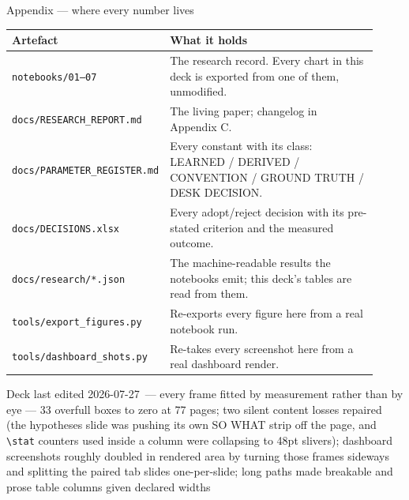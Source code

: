 \documentclass[aspectratio=169,11pt]{beamer}
\newcommand{\lastedited}{2026-07-27}
\newcommand{\lastcommit}{%
  every frame fitted by measurement rather than by eye --- 33 overfull boxes to
  zero at 77 pages; two silent content losses repaired (the hypotheses slide was
  pushing its own SO WHAT strip off the page, and \texttt{\textbackslash stat}
  counters used inside a column were collapsing to 48pt slivers); dashboard
  screenshots roughly doubled in rendered area by turning those frames sideways
  and splitting the paired tab slides one-per-slide; long paths made breakable
  and prose table columns given declared widths}
\newcommand{\pb}{\discretionary{}{}{}}
\begin{document}
\appendix
\begin{frame}{Appendix --- where every number lives}
  \footnotesize
  \begin{table}
    \renewcommand{\arraystretch}{0.92}
    \begin{tabular}{@{}p{0.30\linewidth}p{0.62\linewidth}@{}}
      \toprule
      \textbf{Artefact} & \textbf{What it holds} \\
      \midrule
      \texttt{notebooks/01--07} & The research record. Every chart in this
        deck is exported from one of them, unmodified. \\
      \texttt{docs/\pb RESEARCH\_\pb REPORT.md} & The living paper; changelog in
        Appendix C. \\
      \texttt{docs/\pb PARAMETER\_\pb REGISTER.md} & Every constant with its class:
        LEARNED / DERIVED / CONVENTION / GROUND TRUTH / DESK DECISION. \\
      \texttt{docs/DECISIONS.xlsx} & Every adopt/reject decision with its
        pre-stated criterion and the measured outcome. \\
      \texttt{docs/research/*.json} & The machine-readable results the
        notebooks emit; this deck's tables are read from them. \\
      \texttt{tools/export\_figures.py} & Re-exports every figure here from a
        real notebook run. \\
      \texttt{tools/dashboard\_shots.py} & Re-takes every screenshot here from
        a real dashboard render. \\
      \bottomrule
    \end{tabular}
  \end{table}
  \vspace{-0.2em}
  {\scriptsize\color{giclight}Deck last edited \lastedited\ ---
   \lastcommit}
\end{frame}
\end{document}
